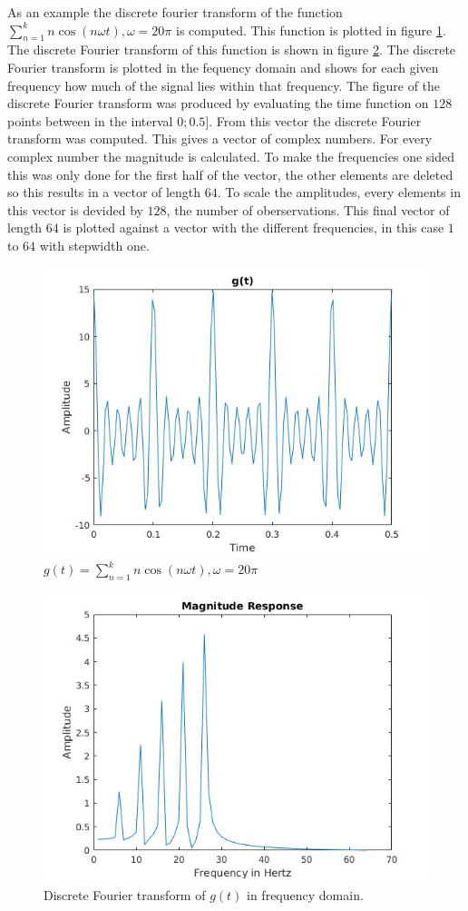 \documentclass[12pt]{article}
\begin{document}
As an example the discrete fourier transform of the function $\sum_{n=1}^{k} n \cos(n\omega t), \omega = 20 \pi$ is computed. This function is plotted in figure \ref{fig3_1}. The discrete Fourier transform of this function is shown in figure \ref{fig3_2}. The discrete Fourier transform is plotted in the fequency domain and shows for each given frequency how much of the signal lies within that frequency. 
The figure of the discrete Fourier transform was produced by evaluating the time function on $128$ points between in the interval $0;0.5]$. From this vector the discrete Fourier transform was computed. This gives a vector of complex numbers. For every complex number the magnitude is calculated. To make the frequencies one sided this was only done for the first half of the vector, the other elements are deleted so this results in a vector of length $64$. To scale the amplitudes, every elements in this vector is devided by $128$, the number of oberservations. This final vector of length $64$ is plotted against a vector with the different frequencies, in this case $1$ to $64$ with stepwidth one.
\begin{figure}[H]
\centering
\includegraphics[width=0.6\linewidth,natwidth=610,natheight=642]{ex3_func_wiki_1_func.jpg}
\caption{$g(t)= \sum_{n=1}^{k} n \cos(n\omega t), \omega = 20 \pi$}
\label{fig3_1}
\end{figure}
%
\begin{figure}[H]
\centering
\includegraphics[width=0.6\linewidth,natwidth=610,natheight=642]{ex3_func_wiki_1_four.jpg}
\caption{Discrete Fourier transform of $g(t)$ in frequency domain.}
\label{fig3_2}
\end{figure}
\end{document}
